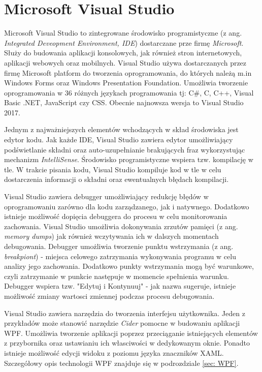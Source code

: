 \section{Microsoft Visual Studio}
Microsoft Visual Studio to zintegrowane środowisko programistyczne (z ang. \textit{Integrated Deveopment Environment, IDE}) dostarczane prze firmę \textit{Microsoft}. Służy do budowania aplikacji konsolowych, jak również stron internetowych, aplikacji webowych oraz mobilnych. Visual Studio używa dostarczanych przez firmę Microsoft platform do tworzenia oprogramowania, do których należą m.in Windows Forms oraz Windows Presentation Foundation. Umożliwia tworzenie oprogramowania w 36 różnych językach programowania tj: C\#, C, C++, Visual Basic .NET, JavaScript czy CSS. Obecnie najnowsza wersja to Visual Studio 2017. 

Jednym z najważniejszych elementów wchodzących w skład środowiska jest edytor kodu. Jak każde IDE, Visual Studio zawiera edytor umożliwiający podświetlanie składni oraz auto-uzupełnianie brakujących fraz wykorzystując mechanizm \textit{IntelliSense}. Środowisko programistyczne wspiera tzw. kompilację w tle. W trakcie pisania kodu, Visual Studio kompiluje kod w tle w celu dostarczenia informacji o składni oraz ewentualnych błędach kompilacji. 

Visual Studio zawiera debugger umożliwiający redukcję błędów w oprogramowaniu zarówno dla kodu zarządzanego, jak i natywnego. Dodatkowo istnieje możliwość dopięcia debuggera do procesu w celu monitorowania zachowania. Visual Studio umożliwia dokonywania zrzutów pamięci (z ang. \textit{memory dumps}) jak również wczytywania ich w dalszych momentach debugowania. Debugger umożliwia tworzenie punktu wstrzymania (z ang. \textit{breakpiont}) - miejsca celowego zatrzymania wykonywania programu w celu analizy jego zachowania. Dodatkowo punkty wstrzymania mogą być warunkowe, czyli zatrzymanie w punkcie następuje w momencie spełnienia warunku. Debugger wspiera tzw. "Edytuj i Kontynuuj" - jak nazwa sugeruje, istnieje możliwość zmiany wartosci zmiennej podczas procesu debugowania.

Visual Studio zawiera narzędzia do tworzenia interfejsu użytkownika. Jeden z przykładów może stanowić narzędzie \textit{Cider} pomocne w budowaniu aplikacji WPF. Umożliwia tworzenie aplikacji poprzez przeciąganie istniejących elementów z przybornika oraz ustawianiu ich własciwości w dedykowanym oknie. Ponadto istnieje możliwość edycji widoku z poziomu języka znaczników XAML. Szczegółowy opis technologii WPF znajduje się w podrozdziale \ref{sec: WPF}.\textsl{}

